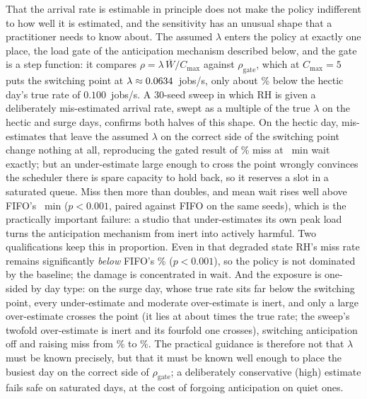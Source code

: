 That the arrival rate is estimable in principle does not make the policy indifferent to how well it is estimated, and the sensitivity has an unusual shape that a practitioner needs to know about. The assumed $\lambda$ enters the policy at exactly one place, the load gate of the anticipation mechanism described below, and the gate is a step function: it compares $\rho = \lambda\,\overline{W}/C_{\max}$ against $\rho_{\text{gate}}$, which at $C_{\max}=5$ puts the switching point at $\lambda \approx 0.0634$~jobs/s, only about \PriorGateShortfall\% below the hectic day's true rate of $0.100$~jobs/s. A 30-seed sweep in which RH is given a deliberately mis-estimated arrival rate, swept as a multiple of the true $\lambda$ on the hectic and surge days, confirms both halves of this shape. On the hectic day, mis-estimates that leave the assumed $\lambda$ on the correct side of the switching point change nothing at all, reproducing the gated result of \RHMiss\% miss at \RHWait~min wait exactly; but an under-estimate large enough to cross the point wrongly convinces the scheduler there is spare capacity to hold back, so it reserves a slot in a saturated queue. Miss then more than doubles, and mean wait rises well above FIFO's \FIFOwait~min ($p<0.001$, paired against FIFO on the same seeds), which is the practically important failure: a studio that under-estimates its own peak load turns the anticipation mechanism from inert into actively harmful. Two qualifications keep this in proportion. Even in that degraded state RH's miss rate remains significantly \emph{below} FIFO's \FIFOmiss\% ($p<0.001$), so the policy is not dominated by the baseline; the damage is concentrated in wait. And the exposure is one-sided by day type: on the surge day, whose true rate sits far below the switching point, every under-estimate and moderate over-estimate is inert, and only a large over-estimate crosses the point (it lies at about \PriorSurgeCrossX{} times the true rate; the sweep's twofold over-estimate is inert and its fourfold one crosses), switching anticipation off and raising miss from \ResSurgeOnMiss\% to \ResSurgeOffMiss\%. The practical guidance is therefore not that $\lambda$ must be known precisely, but that it must be known well enough to place the busiest day on the correct side of $\rho_{\text{gate}}$; a deliberately conservative (high) estimate fails safe on saturated days, at the cost of forgoing anticipation on quiet ones.

